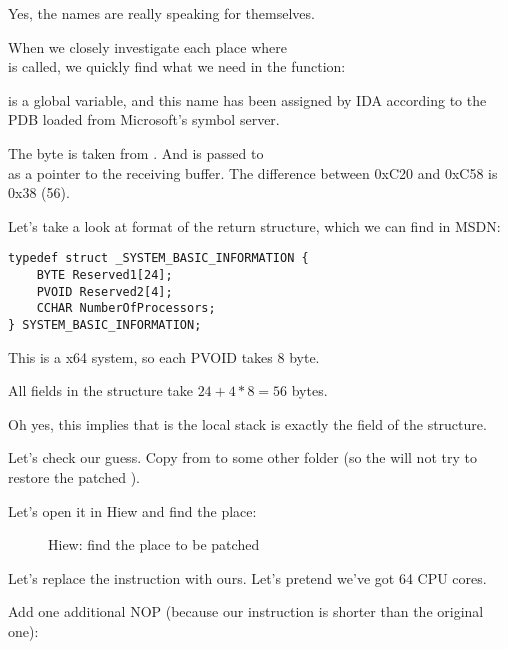 Yes, the names are really speaking for themselves.

When we closely investigate each place where\\
 is called,
we quickly find what we need in the  function:



 is a global variable, and this name has been assigned by 
IDA according to the \gls{PDB} loaded from Microsoft's symbol server.

The byte is taken from . 
And  is passed to\\
as a pointer to the receiving buffer.
The difference between 0xC20 and 0xC58 is 0x38 (56).

Let's take a look at format of the return structure, which we can find in MSDN:

\begin{lstlisting}[style=customc]
typedef struct _SYSTEM_BASIC_INFORMATION {
    BYTE Reserved1[24];
    PVOID Reserved2[4];
    CCHAR NumberOfProcessors;
} SYSTEM_BASIC_INFORMATION;
\end{lstlisting}

This is a x64 system, so each PVOID takes 8 byte.

All  fields in the structure take $24+4*8=56$ bytes.

Oh yes, this implies that  is the local stack is exactly the
 field of the  structure.

Let's check our guess.
Copy  from  
to some other folder 
(so the  
will not try to restore the patched ).

Let's open it in Hiew and find the place:

\begin{figure}[H]
\centering
{}
\caption{Hiew: find the place to be patched}
\end{figure}

Let's replace the  instruction with ours.
Let's pretend we've got 64 CPU cores.

Add one additional \ac{NOP} (because our instruction is shorter than the original one):

